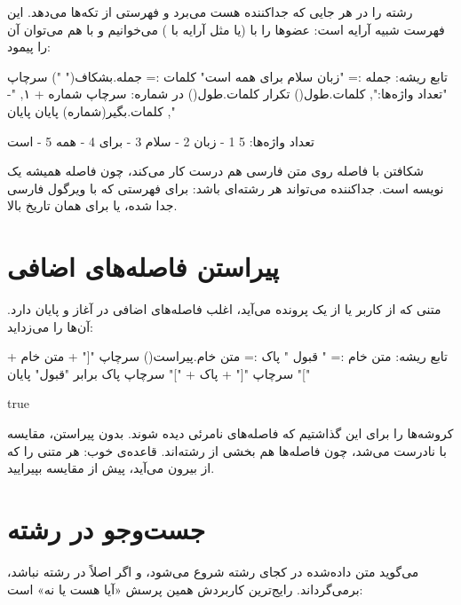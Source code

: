  رشته را در هر جایی که جداکننده هست می‌برد و
فهرستی از تکه‌ها می‌دهد. این فهرست شبیه آرایه است: عضوها را با
 (یا مثل آرایه با \scode{[اندیس]}) می‌خوانیم و با 
هم می‌توان آن را پیمود:

\begin{salamfa}
تابع ریشه:
    جمله := "زبان سلام برای همه است"
    کلمات := جمله.بشکاف(" ")
    سرچاپ "تعداد واژه‌ها:", کلمات.طول()
    تکرار کلمات.طول() در شماره:
        سرچاپ شماره + ۱, "-", کلمات.بگیر(شماره)
    پایان
پایان
\end{salamfa}

\begin{outputfa}
تعداد واژه‌ها: 5
1 - زبان
2 - سلام
3 - برای
4 - همه
5 - است
\end{outputfa}

شکافتن با فاصله روی متن فارسی هم درست کار می‌کند، چون فاصله همیشه یک
نویسه است. جداکننده می‌تواند هر رشته‌ای باشد:  برای
فهرستی که با ویرگول فارسی جدا شده، یا  برای همان تاریخ
بالا.

\section{پیراستن فاصله‌های اضافی}

متنی که از کاربر یا از یک پرونده می‌آید، اغلب فاصله‌های اضافی در آغاز و
پایان دارد.  آن‌ها را می‌زداید:

\begin{salamfa}
تابع ریشه:
    متن خام := "   قبول   "
    پاک := متن خام.پیراست()
    سرچاپ "[" + متن خام + "]"
    سرچاپ "[" + پاک + "]"
    سرچاپ پاک برابر "قبول"
پایان
\end{salamfa}

\begin{outputfa}
[   قبول   ]
[قبول]
true
\end{outputfa}

کروشه‌ها را برای این گذاشتیم که فاصله‌های نامرئی دیده شوند. بدون
پیراستن، مقایسه با  نادرست می‌شد، چون فاصله‌ها هم بخشی از
رشته‌اند. قاعده‌ی خوب: هر متنی را که از بیرون می‌آید، پیش از مقایسه
بپیرایید.

\section{جست‌وجو در رشته}

 می‌گوید متن داده‌شده در کجای رشته شروع می‌شود، و اگر
اصلاً در رشته نباشد،  برمی‌گرداند. رایج‌ترین کاربردش همین پرسش
«آیا هست یا نه» است:

